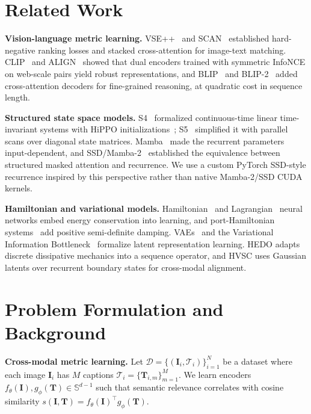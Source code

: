 \documentclass[pdflatex,sn-mathphys-num]{sn-jnl}
\begin{document}
\section{Related Work}
\label{sec:related_work}

\textbf{Vision-language metric learning.} VSE++~\cite{faghri2017vse++} and SCAN~\cite{lee2018stacked} established hard-negative ranking losses and stacked cross-attention for image-text matching. CLIP~\cite{radford2021learning} and ALIGN~\cite{jia2021scaling} showed that dual encoders trained with symmetric InfoNCE on web-scale pairs yield robust representations, and BLIP~\cite{li2022blip} and BLIP-2~\cite{li2023blip2} added cross-attention decoders for fine-grained reasoning, at quadratic cost in sequence length.

\textbf{Structured state space models.} S4~\cite{gu2021efficiently} formalized continuous-time linear time-invariant systems with HiPPO initializations~\cite{gu2020hippo}; S5~\cite{smith2022simplified} simplified it with parallel scans over diagonal state matrices. Mamba~\cite{gu2023mamba} made the recurrent parameters input-dependent, and SSD/Mamba-2~\cite{dao2024transformers} established the equivalence between structured masked attention and recurrence. We use a custom PyTorch SSD-style recurrence inspired by this perspective rather than native Mamba-2/SSD CUDA kernels.

\textbf{Hamiltonian and variational models.} Hamiltonian~\cite{greydanus2019hamiltonian} and Lagrangian~\cite{cranmer2020lagrangian} neural networks embed energy conservation into learning, and port-Hamiltonian systems~\cite{massaroli2019port} add positive semi-definite damping. VAEs~\cite{kingma2013auto} and the Variational Information Bottleneck~\cite{alemi2016deep} formalize latent representation learning. HEDO adapts discrete dissipative mechanics into a sequence operator, and HVSC uses Gaussian latents over recurrent boundary states for cross-modal alignment.

\section{Problem Formulation and Background}
\label{sec:problem_formulation}

\textbf{Cross-modal metric learning.} Let $\mathcal{D} = \{(\mathbf{I}_i, \mathcal{T}_i)\}_{i=1}^N$ be a dataset where each image $\mathbf{I}_i$ has $M$ captions $\mathcal{T}_i = \{\mathbf{T}_{i,m}\}_{m=1}^M$. We learn encoders $f_{\theta}(\mathbf{I}), g_{\phi}(\mathbf{T}) \in \mathbb{S}^{d-1}$ such that semantic relevance correlates with cosine similarity $s(\mathbf{I}, \mathbf{T}) = f_{\theta}(\mathbf{I})^\top g_{\phi}(\mathbf{T})$.
\end{document}
